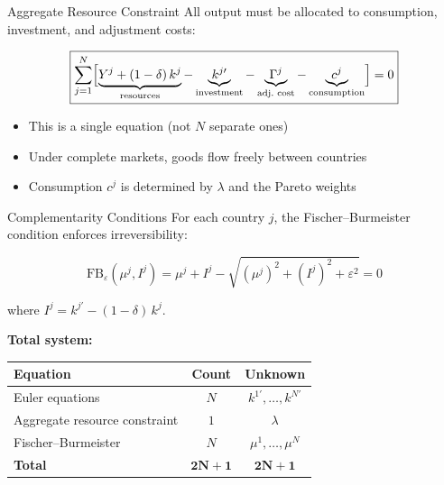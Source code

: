 \documentclass[aspectratio=169,11pt]{beamer}
\newcommand{\emphc}[1]{\textcolor{harvardcrimson}{#1}}
\begin{document}
\begin{frame}{Aggregate Resource Constraint}
All output must be allocated to consumption, investment, and adjustment costs:

\[
\boxed{
\sum_{j=1}^{N} \Bigl[\underbrace{Y^j + (1-\delta)\,k^j}_{\text{resources}} - \underbrace{k^{j\prime}}_{\text{investment}} - \underbrace{\Gamma^j}_{\text{adj.\ cost}} - \underbrace{c^j}_{\text{consumption}}\Bigr] = 0
}
\]

\vspace{0.5em}
\begin{itemize}
    \item This is a \emphc{single} equation (not $N$ separate ones)
    \item Under complete markets, goods flow freely between countries
    \item Consumption $c^j$ is determined by $\lambda$ and the Pareto weights
\end{itemize}
\end{frame}

\begin{frame}{Complementarity Conditions}
For each country $j$, the Fischer--Burmeister condition enforces irreversibility:

\[
\text{FB}_{\varepsilon}(\mu^j, I^j)
= \mu^j + I^j - \sqrt{(\mu^j)^2 + (I^j)^2 + \varepsilon^2} = 0
\]

where $I^j = k^{j\prime} - (1-\delta)\,k^j$.

\vspace{0.5em}
\textbf{Total system:}
\begin{center}
\begin{tabular}{lcc}
\toprule
\textbf{Equation} & \textbf{Count} & \textbf{Unknown} \\
\midrule
Euler equations & $N$ & $k^{1\prime}, \ldots, k^{N\prime}$ \\
Aggregate resource constraint & $1$ & $\lambda$ \\
Fischer--Burmeister & $N$ & $\mu^1, \ldots, \mu^N$ \\
\midrule
\textbf{Total} & $\bm{2N+1}$ & $\bm{2N+1}$ \\
\bottomrule
\end{tabular}
\end{center}
\end{frame}
\end{document}

